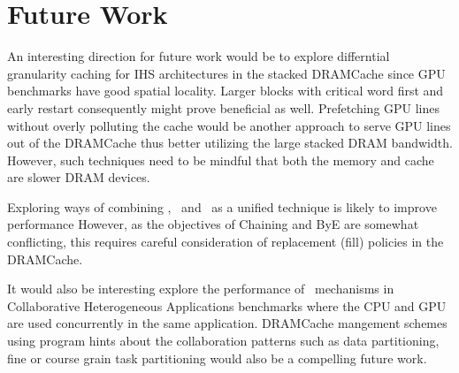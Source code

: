\section{Future Work}
An interesting direction for future work would be to explore differntial granularity caching for IHS architectures in the stacked DRAMCache since GPU benchmarks have good spatial locality. Larger blocks with critical word first and early restart consequently might prove beneficial as well. Prefetching GPU lines without overly polluting the cache would be another approach to serve GPU lines out of the DRAMCache thus better utilizing the large stacked DRAM bandwidth. However, such techniques need to be mindful that both the memory and cache are slower DRAM devices. 
\par Exploring ways of combining \prioname, \chaining\ and \bypassname\ as a unified technique is likely to improve performance However, as the objectives of Chaining and ByE are somewhat conflicting, this requires careful consideration of replacement (fill) policies in the DRAMCache.
\par It would also be interesting explore the performance of \cachename\ mechanisms in Collaborative Heterogeneous Applications benchmarks \cite{chai} where the CPU and GPU are used concurrently in the same application. DRAMCache mangement schemes using program hints about the collaboration patterns such as data partitioning, fine or course grain task partitioning would also be a compelling future work.

